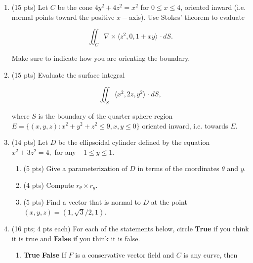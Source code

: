 \documentclass[12 pt]{report}
\begin{document}
\newpage
\begin{enumerate}

\item (15 pts) Let $C$ be the cone $4y^2+4z^2 = x^2$ for $0 \leq x \leq 4$, oriented inward (i.e. normal points toward the positive $x-$axis). Use Stokes' theorem to evaluate

\[
\iint_C \nabla \times \langle z^2, 0, 1+xy \rangle \, \cdot dS.
\]

Make sure to indicate how you are orienting the boundary. 

\vfill

\newpage \item (15 pts) Evaluate the surface integral

\[
\iint_S \langle x^2, 2z, y^2 \rangle \, \cdot dS,
\]

where $S$ is the boundary of the quarter sphere region $E = \{(x,y,z): x^2 + y^2 + z^2 \leq 9, x, y \leq 0 \}$ oriented inward, i.e. towards $E$. 

\vfill

\newpage \item (14 pts) Let $D$ be the ellipsoidal cylinder defined by the equation $x^2 + 3z^2 = 4,$ for any $-1 \leq y \leq 1$. 

\begin{enumerate} \item (5 pts) Give a parameterization of $D$ in terms of the coordinates $\theta$ and $y$. 

\vspace{4cm}

\item (4 pts) Compute $r_\theta \times r_y$. 

\vfill

\item (5 pts) Find a vector that is normal to $D$ at the point $(x,y,z) = (1, \sqrt{3}/2, 1)$. 

\vfill

\end{enumerate}

\newpage \item (16 pts; 4 pts each) For each of the statements below, circle \textbf{True} if you think it is true and \textbf{False} if you think it is false. 

\begin{enumerate} \item \textbf{True}\hspace{5pt} \textbf{False} \hspace{5pt} If $F$ is a conservative vector field and $C$ is any curve, then 


\end{enumerate}
\end{enumerate}
\end{document}

